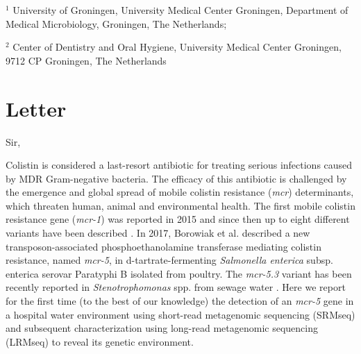 $^1$ University of Groningen, University Medical Center Groningen, Department of Medical Microbiology, Groningen, The Netherlands;

$^2$ Center of Dentistry and Oral Hygiene, University
Medical Center Groningen, 9712 CP Groningen, The Netherlands

\section{Letter}

Sir,

Colistin is considered a last-resort antibiotic for treating serious infections caused by MDR Gram-negative bacteria. 
The efficacy of this antibiotic is challenged by the emergence and global spread of mobile colistin resistance (\textit{mcr}) determinants, which threaten human, animal and environmental health. 
The first mobile colistin resistance gene (\textit{mcr-1}) was reported in 2015 and since then up to eight different variants have been described \citep{wang_emergence_2018}. 
In 2017, Borowiak et al.\citep{borowiak_identification_2017} described a new transposon-associated phosphoethanolamine transferase mediating colistin resistance, named \textit{mcr-5}, in d-tartrate-fermenting \textit{Salmonella enterica} subsp. enterica serovar Paratyphi B isolated from poultry. 
The \textit{mcr-5.3} variant has been recently reported in \textit{Stenotrophomonas} spp. from sewage water \citep{li_co-occurrence_2019}.
Here we report for the first time (to the best of our knowledge) the detection of an \textit{mcr-5} gene in a hospital water environment using short-read metagenomic sequencing (SRMseq) and subsequent characterization using long-read metagenomic sequencing (LRMseq) to reveal its genetic environment.

